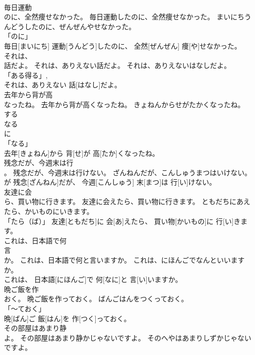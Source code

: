 \documentclass[8pt]{extreport}
\begin{document}
\begin{CJK}{UTF8}{min}
\\	毎日運動
\\	のに、全然痩せなかった。	毎日運動したのに、全然痩せなかった。	まいにちうんどうしたのに、ぜんぜんやせなかった。	
\\	「のに」 
\\	毎日[まいにち] 運動[うんどう]したのに、 全然[ぜんぜん] 痩[や]せなかった。		
\\	それは、
\\	話だよ。	それは、ありえない話だよ。	それは、ありえないはなしだよ。	
\\	「ある得る」, 
\\	それは、ありえない 話[はなし]だよ。		
\\	去年から背が高
\\	なったね。	去年から背が高くなったね。	きょねんからせがたかくなったね。	
\\	する 
\\	なる 
\\	に 
\\	「なる」 
\\	去年[きょねん]から 背[せ]が 高[たか]くなったね。		
\\	残念だが、今週末は行
\\	。	残念だが、今週末は行けない。	ざんねんだが、こんしゅうまつはいけない。	
\\	が	残念[ざんねん]だが、 今週[こんしゅう] 末[まつ]は 行[い]けない。		
\\	友達に会
\\	ら、買い物に行きます。	友達に会えたら、買い物に行きます。	ともだちにあえたら、かいものにいきます。	
\\	「たら（ば）」	友達[ともだち]に 会[あ]えたら、 買い物[かいもの]に 行[い]きます。		
\\	これは、日本語で何
\\	言
\\	か。	これは、日本語で何と言いますか。	これは、にほんごでなんといいますか。	
\\	これは、 日本語[にほんご]で 何[なに]と 言[い]いますか。		
\\	晩ご飯を作
\\	おく。	晩ご飯を作っておく。	ばんごはんをつくっておく。	
\\	「～ておく」 
\\	晩[ばん]ご 飯[はん]を 作[つく]っておく。		
\\	その部屋はあまり静
\\	よ。	その部屋はあまり静かじゃないですよ。	そのへやはあまりしずかじゃないですよ。	

\end{CJK}
\end{document}
